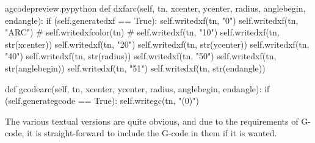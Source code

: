 \documentclass{ltxdoc}
\begin{document}

\lstset{firstnumber=\thegcpy}
\begin{writecode}{a}{gcodepreview.py}{python}
    def dxfarc(self, tn, xcenter, ycenter, radius, anglebegin, endangle):
        if (self.generatedxf == True):
            self.writedxf(tn, "0")
            self.writedxf(tn, "ARC")
#
            self.writedxfcolor(tn)
#
            self.writedxf(tn, "10")
            self.writedxf(tn, str(xcenter))
            self.writedxf(tn, "20")
            self.writedxf(tn, str(ycenter))
            self.writedxf(tn, "40")
            self.writedxf(tn, str(radius))
            self.writedxf(tn, "50")
            self.writedxf(tn, str(anglebegin))
            self.writedxf(tn, "51")
            self.writedxf(tn, str(endangle))

    def gcodearc(self, tn, xcenter, ycenter, radius, anglebegin, endangle):
        if (self.generategcode == True):
            self.writegc(tn, "(0)")

\end{writecode}
\addtocounter{gcpy}{22}

The various textual versions are quite obvious, and due to the requirements of G-code, it is straight-forward to include the G-code in them if it is wanted.
\end{document}
